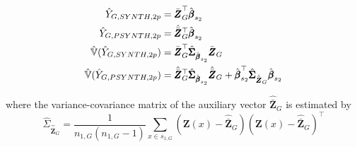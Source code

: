 
\begin{subequations}\label{eq:pest_2p_synth_psynth}
\begin{align}
  \hat{Y}_{G,SYNTH,2p} & =\bar{\pmb{Z}}_G^{\top}\hat{\pmb{\beta}}_{s_2} \label{eq:pointest_2p_reg_synth} \\
  \hat{Y}_{G,PSYNTH,2p} & =\hat{\bar{\pmb{Z}}}_G^{\top}\hat{\pmb{\beta}}_{s_2} \label{eq:pointest_2p_reg_psynth} \\
  \hat{\mathbb{V}}(\hat{Y}_{G,SYNTH,2p}) & = \bar{\pmb{Z}}_G^{\top}\hat{\pmb{\Sigma}}_{\hat{\pmb{\beta}}_{s_2}}\bar{\pmb{Z}}_G \label{eq:var_2p_reg_synth} \\
  \hat{\mathbb{V}}(\hat{Y}_{G,PSYNTH,2p}) & = \hat{\bar{\pmb{Z}}}_G^{\top}\hat{\pmb{\Sigma}}_{\hat{\pmb{\beta}}_{s_2}}\hat{\bar{\pmb{Z}}}_G
  + \hat{\pmb{\beta}}_{s_2}^{\top}\hat{\pmb{\Sigma}}_{\hat{\bar{\pmb{Z}}}_G}\hat{\pmb{\beta}}_{s_2}  \label{eq:var_2p_reg_psynth}
\end{align}
\end{subequations}

where the variance-covariance matrix of the auxiliary vector $\hat{\bar{\pmb{Z}}}_G$ is estimated by
\begin{equation}\label{estvarcovaux_G}
\hat{\Sigma}_{\hat{\bar{\pmb{Z}}}_{G}}=
\frac{1}{n_{1,G}(n_{1,G}-1)}\sum_{x\in{s_{1,G}}}
(\pmb{Z}(x)-\hat{\bar{\pmb{Z}}}_{G})(\pmb{Z}(x)-\hat{\bar{\pmb{Z}}}_{G})^{\top}
\end{equation}


